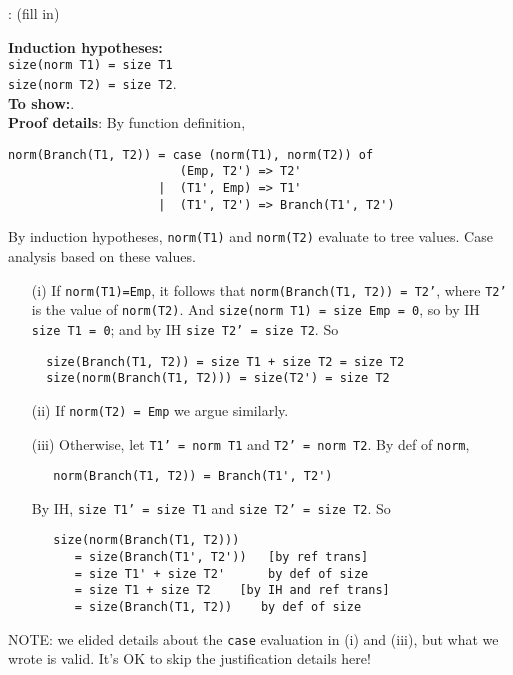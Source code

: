 \documentclass[answers,addpoints,12pt]{exam}
\begin{document}
\begin{questions}
\begin{solution}
: (fill in)

{\bf Induction hypotheses:}\\
\mbox{\qquad }{\tt size(norm T1) = size T1}\\
\mbox{\qquad }{\tt size(norm T2) = size T2}.\\

{\bf To show:}.\\


{\bf Proof details}:
By function definition,
\begin{verbatim}
norm(Branch(T1, T2)) = case (norm(T1), norm(T2)) of 
                        (Emp, T2') => T2'
                     |  (T1', Emp) => T1'
                     |  (T1', T2') => Branch(T1', T2')
\end{verbatim}
By induction hypotheses, {\tt norm(T1)} and {\tt norm(T2)} evaluate to tree values. Case analysis based on these values.
\begin{itemize}
\item[(i)]
If {\tt norm(T1)=Emp}, it follows that {\tt norm(Branch(T1, T2)) = T2'}, where {\tt T2'} is the value of {\tt norm(T2)}.
And {\tt size(norm T1) = size Emp = 0}, so by IH {\tt size T1 = 0}; and by IH  {\tt size T2' = size T2}. So
\begin{verbatim}
  size(Branch(T1, T2)) = size T1 + size T2 = size T2
  size(norm(Branch(T1, T2))) = size(T2') = size T2
\end{verbatim}

\item[(ii)] If {\tt norm(T2) = Emp} we argue similarly.

\item[(iii)] Otherwise, let {\tt T1' = norm T1} and {\tt T2' = norm T2}. By def of {\tt norm},
\begin{verbatim}
   norm(Branch(T1, T2)) = Branch(T1', T2')
\end{verbatim}
By IH, {\tt size T1' = size T1} and {\tt size T2' = size T2}.
So
\begin{verbatim}
   size(norm(Branch(T1, T2))) 
      = size(Branch(T1', T2'))   [by ref trans]
      = size T1' + size T2'      by def of size
      = size T1 + size T2    [by IH and ref trans]
      = size(Branch(T1, T2))    by def of size
\end{verbatim}
\end{itemize}

NOTE: we elided details about the {\tt case} evaluation in (i) and (iii), but what we wrote is valid.
It's OK to skip the justification details here!


\end{solution}
\end{questions}
\end{document}
